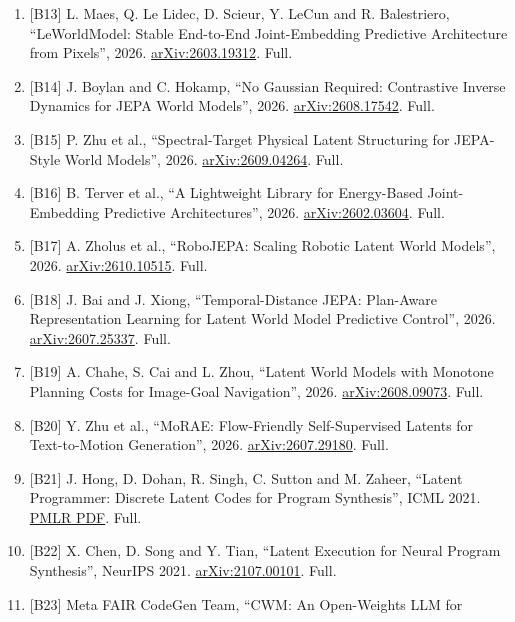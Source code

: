 \documentclass[10pt,letterpaper]{article}
\begin{document}
\begin{enumerate}
  {[}B12{]} Sanity, ``Decision model'' (glossary).
  \href{https://www.sanity.io/glossary/decision-model}{sanity.io}. Full.
\item
  {[}B13{]} L. Maes, Q. Le Lidec, D. Scieur, Y. LeCun and R.
  Balestriero, ``LeWorldModel: Stable End-to-End Joint-Embedding
  Predictive Architecture from Pixels'', 2026.
  \href{https://arxiv.org/abs/2603.19312}{arXiv:2603.19312}. Full.
\item
  {[}B14{]} J. Boylan and C. Hokamp, ``No Gaussian Required: Contrastive
  Inverse Dynamics for JEPA World Models'', 2026.
  \href{https://arxiv.org/abs/2608.17542}{arXiv:2608.17542}. Full.
\item
  {[}B15{]} P. Zhu et al., ``Spectral-Target Physical Latent Structuring
  for JEPA-Style World Models'', 2026.
  \href{https://arxiv.org/abs/2609.04264}{arXiv:2609.04264}. Full.
\item
  {[}B16{]} B. Terver et al., ``A Lightweight Library for Energy-Based
  Joint-Embedding Predictive Architectures'', 2026.
  \href{https://arxiv.org/abs/2602.03604}{arXiv:2602.03604}. Full.
\item
  {[}B17{]} A. Zholus et al., ``RoboJEPA: Scaling Robotic Latent World
  Models'', 2026.
  \href{https://arxiv.org/abs/2610.10515}{arXiv:2610.10515}. Full.
\item
  {[}B18{]} J. Bai and J. Xiong, ``Temporal-Distance JEPA: Plan-Aware
  Representation Learning for Latent World Model Predictive Control'',
  2026. \href{https://arxiv.org/abs/2607.25337}{arXiv:2607.25337}. Full.
\item
  {[}B19{]} A. Chahe, S. Cai and L. Zhou, ``Latent World Models with
  Monotone Planning Costs for Image-Goal Navigation'', 2026.
  \href{https://arxiv.org/abs/2608.09073}{arXiv:2608.09073}. Full.
\item
  {[}B20{]} Y. Zhu et al., ``MoRAE: Flow-Friendly Self-Supervised
  Latents for Text-to-Motion Generation'', 2026.
  \href{https://arxiv.org/abs/2607.29180}{arXiv:2607.29180}. Full.
\item
  {[}B21{]} J. Hong, D. Dohan, R. Singh, C. Sutton and M. Zaheer,
  ``Latent Programmer: Discrete Latent Codes for Program Synthesis'',
  ICML 2021.
  \href{https://proceedings.mlr.press/v139/hong21a/hong21a.pdf}{PMLR
  PDF}. Full.
\item
  {[}B22{]} X. Chen, D. Song and Y. Tian, ``Latent Execution for Neural
  Program Synthesis'', NeurIPS 2021.
  \href{https://arxiv.org/abs/2107.00101}{arXiv:2107.00101}. Full.
\item
  {[}B23{]} Meta FAIR CodeGen Team, ``CWM: An Open-Weights LLM for

\end{enumerate}
\end{document}
